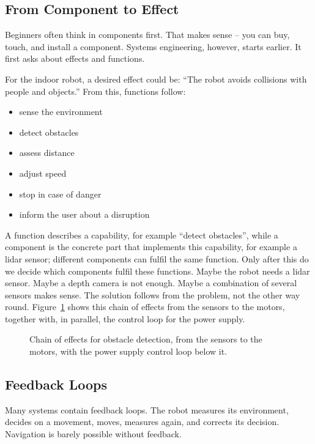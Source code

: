 \subsection{From Component to Effect}
Beginners often think in components first. That makes sense -- you can buy, touch, and install a component. Systems engineering, however, starts earlier. It first asks about effects and functions.

For the indoor robot, a desired effect could be: \enquote{The robot avoids collisions with people and objects.} From this, functions follow:

\begin{itemize}
    \item sense the environment
    \item detect obstacles
    \item assess distance
    \item adjust speed
    \item stop in case of danger
    \item inform the user about a disruption
\end{itemize}

A function describes a capability, for example \enquote{detect obstacles}, while a component is the concrete part that implements this capability, for example a lidar sensor; different components can fulfil the same function. Only after this do we decide which components fulfil these functions. Maybe the robot needs a lidar sensor. Maybe a depth camera is not enough. Maybe a combination of several sensors makes sense. The solution follows from the problem, not the other way round. Figure~\ref{fig:kap01-wirkkette} shows this chain of effects from the sensors to the motors, together with, in parallel, the control loop for the power supply.

\begin{figure}[H]
  \centering
  \caption{Chain of effects for obstacle detection, from the sensors to the motors, with the power supply control loop below it.}
  \label{fig:kap01-wirkkette}
\end{figure}

\subsection{Feedback Loops}
Many systems contain feedback loops. The robot measures its environment, decides on a movement, moves, measures again, and corrects its decision. Navigation is barely possible without feedback.

